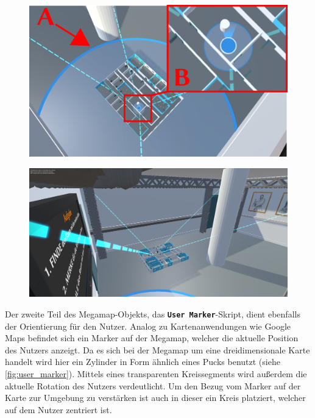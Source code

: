 \begin{figure}
    \centering
    \begin{minipage}[t]{.485\textwidth}
        \centering
        \vspace{0pt}
        \includegraphics[width=\linewidth]{figures/megamap_user_marker.pdf}
        \label{fig:user_marker}
        \vfill
    \end{minipage}
    \hfill
    \begin{minipage}[t]{.485\textwidth}
        \centering
        \vspace{0pt}
        \includegraphics[width=\linewidth]{figures/megamap_room_guides}
        \label{fig:room_guides}
    \end{minipage}
\end{figure}

Der zweite Teil des Megamap-Objekts, das \textbf{\lstinline|User Marker|}-Skript, dient ebenfalls der Orientierung für den Nutzer.
Analog zu Kartenanwendungen wie Google Maps befindet sich ein Marker auf der Megamap, welcher die aktuelle Position des Nutzers anzeigt.
Da es sich bei der Megamap um eine dreidimensionale Karte handelt wird hier ein Zylinder in Form ähnlich eines Pucks benutzt (siehe \autoref{fig:user_marker}).
Mittels eines transparenten Kreissegments wird außerdem die aktuelle Rotation des Nutzers verdeutlicht.
Um den Bezug vom Marker auf der Karte zur Umgebung zu verstärken ist auch in dieser ein Kreis platziert, welcher auf dem Nutzer zentriert ist.

